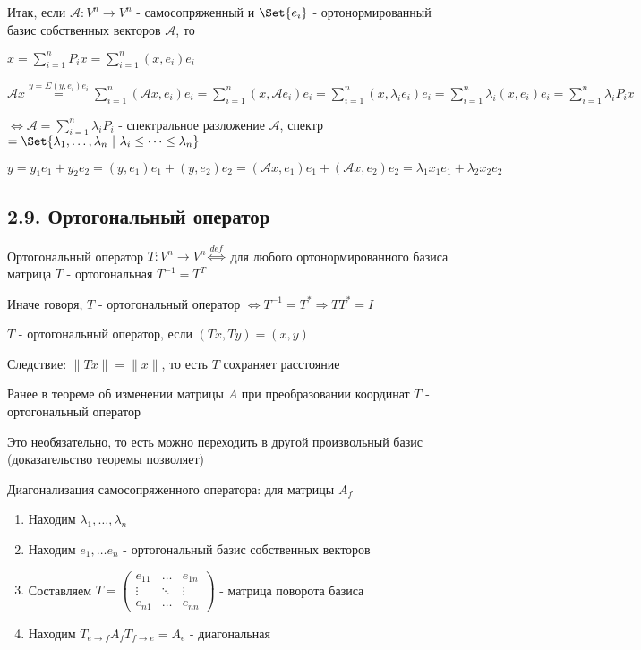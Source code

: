 \documentclass[12pt]{article}
\begin{document}
    Итак, если $\mathcal{A}: V^n \to V^n$ - самосопряженный и $\Set{e_i}$ - ортонормированный базис собственных векторов $\mathcal{A}$, то

    $x = \sum_{i = 1}^{n} P_i x = \sum_{i = 1}^{n} (x, e_i) e_i$

    $\mathcal{A} x \stackrel{y = \Sigma (y, e_i) e_i}{=} \sum_{i = 1}^{n} (\mathcal{A}x, e_i) e_i =
    \sum_{i = 1}^{n} (x, \mathcal{A}e_i) e_i = \sum_{i = 1}^{n} (x, \lambda_i e_i) e_i =
    \sum_{i = 1}^{n} \lambda_i (x, e_i) e_i = \sum_{i = 1}^{n} \lambda_i P_i x$

    $\Longleftrightarrow \mathcal{A} = \sum_{i = 1}^{n} \lambda_i P_i$ - спектральное разложение $\mathcal{A}$,
    спектр $= \Set{\lambda_1, \dots, \lambda_n \ | \ \lambda_i \leq \dots \leq \lambda_n}$

    \Ex $y = y_1 e_1 + y_2 e_2 = (y, e_1) e_1 + (y, e_2) e_2 = (\mathcal{A}x, e_1) e_1 + (\mathcal{A}x, e_2) e_2 = \lambda_1 x_1 e_1 + \lambda_2 x_2 e_2$

    \subsection[p2\_9]{2.9. Ортогональный оператор}

    \hypertarget{orthogonaloperator}{}

    \Mem Ортогональный оператор $T: V^n \to V^n \overset{def}{\Longleftrightarrow}$ для любого ортонормированного базиса матрица $T$ - ортогональная $T^{-1} = T^T$

    \Nota Иначе говоря, $T$ - ортогональный оператор $\Longleftrightarrow T^{-1} = T^* \Longrightarrow T T^* = I$

    \Def $T$ - ортогональный оператор, если $(Tx, Ty) = (x, y)$

    Следствие: $\|Tx\| = \|x\|$, то есть $T$ сохраняет расстояние

    \Nota Ранее в теореме об изменении матрицы $A$ при преобразовании координат $T$ - ортогональный оператор

    Это необязательно, то есть можно переходить в другой произвольный базис (доказательство теоремы позволяет)

    Диагонализация самосопряженного оператора: для матрицы $A_f$

    \begin{enumerate}
        \item Находим $\lambda_1, \dots, \lambda_n$

        \item Находим $e_1, \dots e_n$ - ортогональный базис собственных векторов

        \item Составляем $T = \begin{pmatrix}e_{11} & \dots & e_{1n} \\ \vdots & \ddots & \vdots \\ e_{n1} & \dots & e_{nn}\end{pmatrix}$ - матрица поворота базиса

        \item Находим $T_{e\to f}A_f T_{f\to e} = A_e$ - диагональная
    \end{enumerate}
\end{document}
